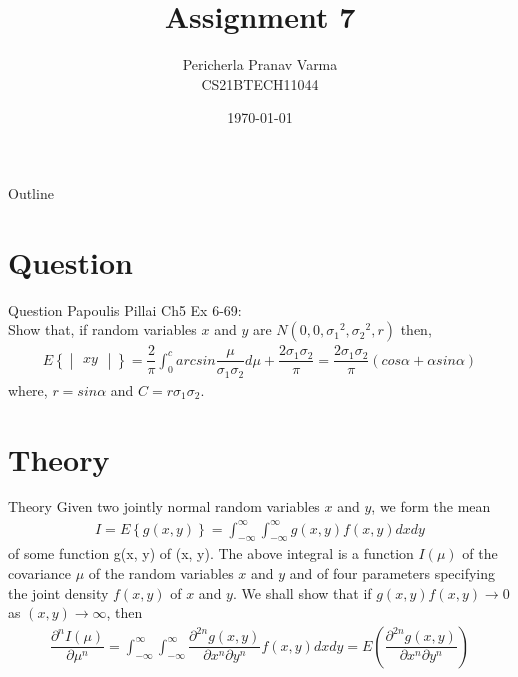 \documentclass{beamer}
\title{Assignment 7}
\author{Pericherla Pranav Varma\\CS21BTECH11044}
\date{\today}
\providecommand{\cbrak}[1]{\ensuremath{\left\{#1\right\}}}
\providecommand{\brak}[1]{\ensuremath{\left(#1\right)}}
\newcommand{\mydet}[1]{\ensuremath{\begin{vmatrix}#1\end{vmatrix}}}
\providecommand{\cbrak}[1]{\ensuremath{\left\{#1\right\}}}
\begin{document}
    \begin{frame}
        \titlepage 
    \end{frame}

    \begin{frame}{Outline}
        \tableofcontents
    \end{frame}

    \section{Question}
    	\begin{frame}{Question}
    	Papoulis Pillai Ch5 Ex 6-69:\\[9pt]
    Show that, if random variables $x$ and $y$ are $N(0,0,{\sigma_1}^2,{\sigma_2}^2,r)$ then,\\[6pt]
   	\begin{align*}
   	E \cbrak{ \mydet {xy} } = \dfrac{2}{\pi} \int_{0}^{c} arcsin \dfrac{\mu}{\sigma_1 \sigma_2} d \mu + \dfrac{2 \sigma_1 \sigma_2}{\pi} = \dfrac{2 \sigma_1 \sigma_2}{\pi} (cos \alpha + \alpha sin \alpha)
   	\end{align*}
	where, $r = sin \alpha $ and $C = r \sigma_1 \sigma_2.$
  
    	\end{frame}
%    
	\section{Theory}
	\begin{frame}{Theory}
	Given two jointly normal random variables $x$ and $y$, we form the mean 		
		\begin{align*}
		I = E \cbrak{g(x,y)} = \int_{- \infty}^{\infty} \int_{- \infty}^{\infty} g(x,y) f(x,y) dx dy
		\end{align*}
		of some function g(x, y) of (x, y). The above integral is a function $I(\mu)$ of the covariance
$\mu$ of the random variables $x$ and $y$ and of four parameters specifying the joint density
$f(x, y)$ of $x$ and $y$. We shall show that if $g(x, y)f(x, y) \longrightarrow 0$ as $(x, y) \longrightarrow \infty$, then 
		\begin{align*}
		\dfrac{\partial^n I(\mu)}{\partial {\mu}^n} = \int_{- \infty}^{\infty} \int_{- \infty}^{\infty} \dfrac{\partial^{2n} g(x,y)}{\partial x^n \partial y^n} f(x,y) dx dy = E \brak{\dfrac{\partial^{2n} g(x,y)}{\partial x^n \partial y^n}}
		\end{align*}
	\end{frame}
	
\end{document}
